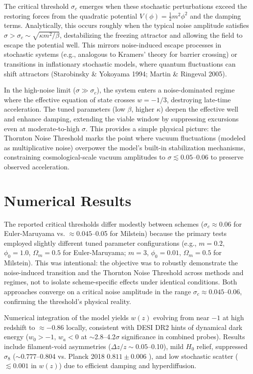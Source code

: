 \documentclass[preprint]{aastex7}
\begin{document}
The critical threshold \( \sigma_c \) emerges when these stochastic perturbations exceed the restoring forces from the quadratic potential \( V(\phi) = \frac{1}{2} m^2 \phi^2 \) and the damping terms. Analytically, this occurs roughly when the typical noise amplitude satisfies \( \sigma > \sigma_c \sim \sqrt{\kappa m^2 / \beta} \), destabilizing the freezing attractor and allowing the field to escape the potential well. This mirrors noise-induced escape processes in stochastic systems (e.g., analogous to Kramers' theory for barrier crossing) or transitions in inflationary stochastic models, where quantum fluctuations can shift attractors (Starobinsky \& Yokoyama 1994; Martin \& Ringeval 2005).

In the high-noise limit (\( \sigma \gg \sigma_c \)), the system enters a noise-dominated regime where the effective equation of state crosses \( w = -1/3 \), destroying late-time acceleration. The tuned parameters (low \( \beta \), higher \( \kappa \)) deepen the effective well and enhance damping, extending the viable window by suppressing excursions even at moderate-to-high \( \sigma \). This provides a simple physical picture: the Thornton Noise Threshold marks the point where vacuum fluctuations (modeled as multiplicative noise) overpower the model's built-in stabilization mechanisms, constraining cosmological-scale vacuum amplitudes to \( \sigma \lesssim 0.05 \)--0.06 to preserve observed acceleration.

\section{Numerical Results}\label{sec:results}

The reported critical thresholds differ modestly between schemes (\( \sigma_c \approx 0.06 \) for Euler-Maruyama vs. \( \approx 0.045 \)--0.05 for Milstein) because the primary tests employed slightly different tuned parameter configurations (e.g., \( m = 0.2 \), \( \phi_0 = 1.0 \), \( \Omega_m = 0.5 \) for Euler-Maruyama; \( m = 3 \), \( \phi_0 = 0.01 \), \( \Omega_m = 0.5 \) for Milstein). This was intentional: the objective was to robustly demonstrate the noise-induced transition and the Thornton Noise Threshold across methods and regimes, not to isolate scheme-specific effects under identical conditions. Both approaches converge on a critical noise amplitude in the range \( \sigma_c \approx 0.045 \)--0.06, confirming the threshold's physical reality.

Numerical integration of the model yields \( w(z) \) evolving from near \( -1 \) at high redshift to \( \approx -0.86 \) locally, consistent with DESI DR2 hints of dynamical dark energy (\( w_0 > -1 \), \( w_a < 0 \) at $\sim$2.8--4.2\( \sigma \) significance in combined probes). Results include filament-void asymmetries (\( \Delta z/z \sim 0.05 \)--0.10), mild \( H_0 \) relief, suppressed \( \sigma_8 \) (\(  \sim 0.777 \)--0.804 vs. Planck 2018 \( 0.811 \pm 0.006\) ), and low stochastic scatter ( \( \lesssim 0.001 \) in \( w(z) \)) due to efficient damping and hyperdiffusion.
\end{document}
